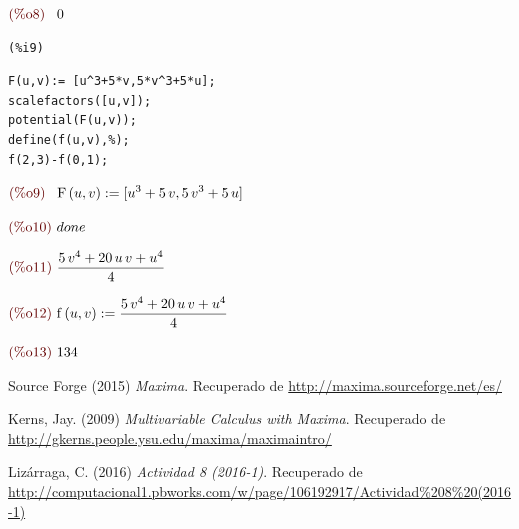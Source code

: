 \documentclass[12pt]{article}
\begin{document}
\begin{math}\displaystyle
\parbox{8ex}{\color{labelcolor}(\%o8) }
0
\end{math}


\noindent
\begin{minipage}[t]{8ex}{\color{red}\bf
\begin{verbatim}
(%i9) 
\end{verbatim}}
\end{minipage}
\begin{minipage}[t]{\textwidth}{\color{blue}
\begin{verbatim}
F(u,v):= [u^3+5*v,5*v^3+5*u];
scalefactors([u,v]);
potential(F(u,v));
define(f(u,v),%);
f(2,3)-f(0,1);
\end{verbatim}}
\end{minipage}
\begin{math}\displaystyle
\parbox{8ex}{\color{labelcolor}(\%o9) }
\mathrm{F}\left( u,v\right) :=[{u}^{3}+5\,v,5\,{v}^{3}+5\,u]
\end{math}

\begin{math}\displaystyle
\parbox{8ex}{\color{labelcolor}(\%o10) }
done
\end{math}

\begin{math}\displaystyle
\parbox{8ex}{\color{labelcolor}(\%o11) }
\frac{5\,{v}^{4}+20\,u\,v+{u}^{4}}{4}
\end{math}

\begin{math}\displaystyle
\parbox{8ex}{\color{labelcolor}(\%o12) }
\mathrm{f}\left( u,v\right) :=\frac{5\,{v}^{4}+20\,u\,v+{u}^{4}}{4}
\end{math}

\begin{math}\displaystyle
\parbox{8ex}{\color{labelcolor}(\%o13) }
134
\end{math}

\begin{thebibliography}{3}
Source Forge (2015)
\emph{Maxima}. Recuperado de \url{http://maxima.sourceforge.net/es/}

Kerns, Jay. (2009)
\emph{Multivariable Calculus with Maxima}. Recuperado de \url{http://gkerns.people.ysu.edu/maxima/maximaintro/}

Lizárraga, C. (2016)
\emph{Actividad 8 (2016-1)}. Recuperado de \url{http://computacional1.pbworks.com/w/page/106192917/Actividad\%208\%20(2016-1)}
\end{thebibliography}
\end{document}
